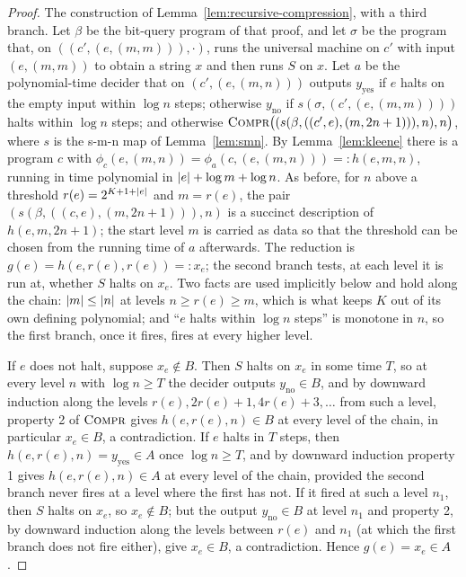 \begin{proof}
\leanok
The construction of Lemma~\ref{lem:recursive-compression}, with a third branch. Let
$\beta$ be the bit-query program of that proof, and let $\sigma$ be the program that, on
$((c', (e, (m, m))), \cdot)$, runs the universal machine on $c'$ with input $(e, (m, m))$
to obtain a string $x$ and then runs $S$ on $x$. Let $a$ be the polynomial-time decider
that on $(c', (e, (m, n)))$ outputs $y_{\mathrm{yes}}$ if $e$ halts on the empty input
within $\log n$ steps; otherwise $y_{\mathrm{no}}$ if $s(\sigma, (c', (e, (m, m))))$
halts within $\log n$ steps; and otherwise $\textsc{Compr}\bigl((s(\beta, ((c', e), (m,
2n+1))), n), n\bigr)$, where $s$ is the s-m-n map of Lemma~\ref{lem:smn}. By
Lemma~\ref{lem:kleene} there is a program $c$ with $\phi_c(e, (m, n)) = \phi_a(c, (e, (m,
n))) =: h(e, m, n)$, running in time polynomial in $\left\vert {e} \right\vert + \log m + \log n$. As
before, for $n$ above a threshold $r(e) = 2^{K + 1 + \left\vert {e} \right\vert}$ and $m = r(e)$, the pair
$(s(\beta, ((c, e), (m, 2n+1))), n)$ is a succinct description of $h(e, m, 2n+1)$; the
start level $m$ is carried as data so that the threshold can be chosen from the running
time of $a$ afterwards. The reduction is $g(e) = h(e, r(e), r(e)) =: x_e$; the second
branch tests, at each level it is run at, whether $S$ halts on $x_e$. Two facts are used
implicitly below and hold along the chain: $\left\vert {m} \right\vert \leq \left\vert {n} \right\vert$ at levels $n \geq r(e)
\geq m$, which is what keeps $K$ out of its own defining polynomial; and ``$e$ halts within
$\log n$ steps'' is monotone in $n$, so the first branch, once it fires, fires at every
higher level.

If $e$ does not halt, suppose $x_e \notin B$. Then $S$ halts on $x_e$ in some time $T$,
so at every level $n$ with $\log n \geq T$ the decider outputs $y_{\mathrm{no}} \in B$,
and by downward induction along the levels $r(e), 2r(e)+1, 4r(e)+3, \ldots$ from such a
level, property 2 of $\textsc{Compr}$ gives $h(e, r(e), n) \in B$ at every level of the chain, in particular
$x_e \in B$, a contradiction. If $e$ halts in $T$ steps, then $h(e, r(e), n) =
y_{\mathrm{yes}} \in A$ once $\log n \geq T$, and by downward induction property 1 gives
$h(e, r(e), n) \in A$ at every level of the chain, provided the second branch never fires at a level
where the first has not. If it fired at such a level $n_1$, then $S$ halts on $x_e$, so
$x_e \notin B$; but the output $y_{\mathrm{no}} \in B$ at level $n_1$ and property 2, by
downward induction along the levels between $r(e)$ and $n_1$ (at which the first branch
does not fire either), give $x_e \in B$, a contradiction. Hence $g(e) = x_e \in A$.
\end{proof}

